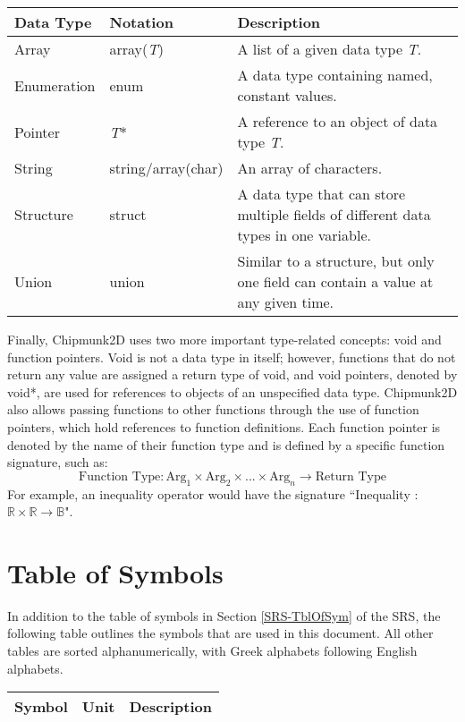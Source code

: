 \documentclass[12pt]{article}
\newcommand{\inquote}[1]{``{#1}"}
\newcommand{\progname}{Chipmunk2D }
\begin{document}
\renewcommand*{\arraystretch}{1.2}
\noindent \begin{longtable}{l l p{9.5cm}}
\toprule
	\textbf{Data Type} & \textbf{Notation} & \textbf{Description} \\
\midrule
	Array & array(\textit{T}) & A list of a given data type \textit{T}. \\
	Enumeration & enum & A data type containing named, constant values. \\
	Pointer & \textit{T}* & A reference to an object of data type \textit{T}. \\
	String & string/array(char) & An array of characters. \\
	Structure & struct & A data type that can store multiple fields of different data types in one variable. \\
	Union & union & Similar to a structure, but only one field can contain a value at any given time. \\
	\bottomrule
\end{longtable}

\noindent Finally, \progname uses two more important type-related concepts: void and function pointers. Void is not a data type in itself; however, functions that do not return any value are assigned a return type of void, and void pointers, denoted by void*, are used for references to objects of an unspecified data type. \progname also allows passing functions to other functions through the use of function pointers, which hold references to function definitions. Each function pointer is denoted by the name of their function type and is defined by a specific function signature, such as: 
$$\text{Function Type} : \text{Arg}_1 \times \text{Arg}_2 \times ... \times \text{Arg}_n \to \text{Return Type}$$
For example, an inequality operator would have the signature \inquote{Inequality : $\mathbb{R} \times \mathbb{R} \to \mathbb{B}$}.

\iffalse

\section{Table of Symbols}

In addition to the table of symbols in Section 
\ref{SRS-TblOfSym} of the SRS, the following table outlines the 
symbols that are used in this document. All other tables are sorted alphanumerically, with Greek alphabets following English alphabets. 

\renewcommand*{\arraystretch}{1.2}
\noindent 
\begin{longtable}{l l p{12cm}} 
\toprule 
\textbf{Symbol} & \textbf{Unit} & \textbf{Description}\\ \midrule
\bottomrule 
\end{longtable} 
\end{document}
